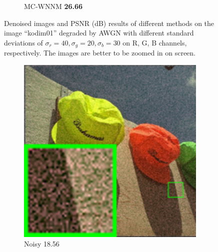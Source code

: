 \begin{figure}
\begin{subfigure}[t]{0.19\textwidth}
		\caption{MC-WNNM \textbf{26.66}}
    \end{subfigure}
    \caption{Denoised images and PSNR (dB) results of different methods on the image ``kodim01'' degraded by AWGN with different standard deviations of $\sigma_{r}=40, \sigma_{g}=20, \sigma_{b}=30$ on R, G, B channels, respectively. The images are better to be zoomed in on screen.}
    \label{fig4-3}
\end{figure}

\begin{figure}
    \centering
    \begin{subfigure}[t]{0.19\textwidth}
        \centering
        \includegraphics[width=1\textwidth]{images/mcwnnm/24images/resize_br_Noisy_nSig402030_kodim03.png}
		\caption{Noisy 18.56}
    \end{subfigure}
    \hfill
    \begin{subfigure}[t]{0.19\textwidth}
        \centering

\end{subfigure}
\end{figure}
